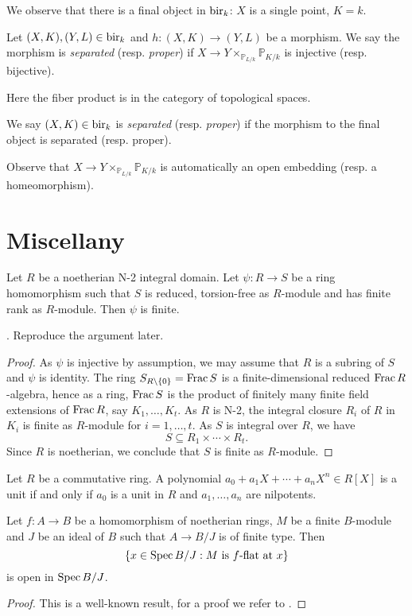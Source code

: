 We observe that there is a final object in $\mathrm{bir}_k$: $X$ is a single point, $K=k$. 

\begin{definition}
    Let $(X,K),(Y,L)\in \mathrm{bir}_k$ and $h:(X,K)\rightarrow(Y,L)$ be a morphism. We say the morphism is \emph{separated} (resp. \emph{proper}) if $X\rightarrow Y\times_{\mathbb{P}_{L/k}}\mathbb{P}_{K/k}$ is injective (resp. bijective).

    Here the fiber product is in the category of topological spaces.

    We say $(X,K)\in \mathrm{bir}_k$ is \emph{separated} (resp. \emph{proper}) if the morphism to the final object is separated (resp. proper).
\end{definition}
Observe that $X\rightarrow Y\times_{\mathbb{P}_{L/k}}\mathbb{P}_{K/k}$ is automatically an open embedding (resp. a homeomorphism).



\section{Miscellany}

\begin{proposition}\label{prop-noethjapfinite}
    Let $R$ be a noetherian N-2 integral domain. Let $\psi:R\rightarrow S$ be a ring homomorphism such that $S$ is reduced, torsion-free as $R$-module and has finite rank as $R$-module. Then $\psi$ is finite.
\end{proposition}
\cite[Page~122]{BGR}. Reproduce the argument later.
\begin{proof}
    As $\psi$ is injective by assumption, we may assume that $R$ is a subring of $S$ and $\psi$ is identity. The ring $S_{R\setminus\{0\}}=\operatorname{Frac} S$ is a finite-dimensional reduced $\operatorname{Frac} R$-algebra, hence as a ring, $\operatorname{Frac} S$ is the product of finitely many finite field extensions of $\operatorname{Frac} R$, say $K_1,\ldots,K_t$.  As $R$ is N-2, the integral closure $R_i$ of $R$ in $K_i$ is finite as $R$-module for $i=1,\ldots,t$. As $S$ is integral over $R$, we have
    \[
        S\subseteq R_1\times \cdots \times R_t.  
    \]
    Since $R$ is noetherian, we conclude that $S$ is finite as $R$-module.
\end{proof}

\begin{lemma}
    Let $R$ be a commutative ring. A polynomial $a_0+a_1X+\cdots+a_nX^n\in R[X]$ is a unit if and only if $a_0$ is a unit in $R$ and $a_1,\ldots,a_n$ are nilpotents.
\end{lemma}


\begin{lemma}\label{lma-flatlocusopenalge}
    Let $f:A\rightarrow B$ be a homomorphism of noetherian rings, $M$ be a finite $B$-module and $J$ be an ideal of $B$ such that $A\rightarrow B/J$ is of finite type. Then
    \[  
        \left\{ x\in \operatorname{Spec} B/J: M\text{ is }f\text{-flat at }x \right\}
    \]
    is open in $\operatorname{Spec} B/J$.
\end{lemma}
\begin{proof}
    This is a well-known result, for a proof we refer to \cite[Satz~1]{Kie67}.
\end{proof}

\printbibliography
